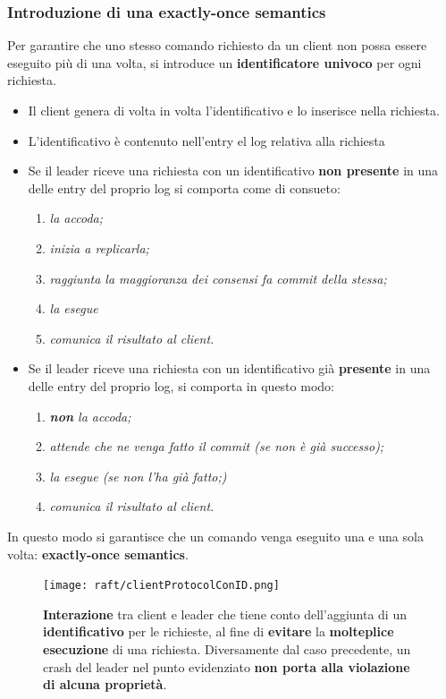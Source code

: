  	\subsubsection{Introduzione di una exactly-once semantics}
 	Per garantire che uno stesso comando richiesto da un client non possa essere eseguito più di una volta, si introduce un \textbf{identificatore univoco} per ogni richiesta.  

 	\begin{itemize}
 		\item{{Il client genera di volta in volta l'identificativo e lo inserisce nella richiesta.}}
 		\item{{L'identificativo è contenuto nell'entry el log relativa alla richiesta}}
 		\item{{Se il leader riceve una richiesta con un identificativo \textbf{non presente} in una delle entry del proprio log si comporta come di consueto: 
 			\begin{enumerate}
 				\item{\emph{la accoda;}}
 				\item{\emph{inizia a replicarla;}}
 				\item{\emph{raggiunta la maggioranza dei consensi fa commit della stessa;}}
 				\item{\emph{la esegue}}
 				\item{\emph{comunica il risultato al client.}}
 			\end{enumerate}
 		}}
 		\item{Se il leader riceve una richiesta con un identificativo già \textbf{presente} in una delle entry del proprio log, si comporta in questo modo:
			\begin{enumerate}
 				\item{\emph{\textbf{non} la accoda;}}
 				\item{\emph{attende che ne venga fatto il commit (se non è già successo);}}
 				\item{\emph{la esegue (se non l'ha già fatto;)}}
 				\item{\emph{comunica il risultato al client.}}
 				
 			\end{enumerate}
 		}
 		
 	\end{itemize}

In questo modo si garantisce che un comando venga eseguito una e una sola volta: \textbf{exactly-once semantics}.

	  \begin{figure}[H]
	    \centering
	    \texttt{[image: raft/clientProtocolConID.png]}
	    \caption{\textbf{Interazione} tra client e leader che tiene conto dell'aggiunta di un \textbf{identificativo} per le richieste, al fine di \textbf{evitare} la \textbf{molteplice esecuzione} di una richiesta. Diversamente dal caso precedente, un crash del leader nel punto evidenziato \textbf{non porta alla violazione di alcuna proprietà}.}
	    \label{fig:figure 13}
	  \end{figure} 

